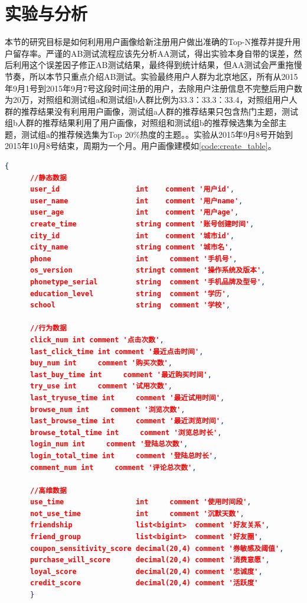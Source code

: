   \section{实验与分析}
  本节的研究目标是如何利用用户画像给新注册用户做出准确的Top-N推荐并提升用户留存率。严谨的AB测试流程应该先分析AA测试，得出实验本身自带的误差，然后利用这个误差因子修正AB测试结果，最终得到统计结果，但AA测试会严重拖慢节奏，所以本节只重点介绍AB测试。实验最终用户人群为北京地区，所有从2015年9月1号到2015年9月7号这段时间注册的用户，去除用户注册信息不完整后用户数为20万，对照组和测试组a和测试组b人群比例为33.3：33.3：33.4，对照组用户人群的推荐结果没有利用用户画像，测试组a人群的推荐结果只包含热门主题，测试组b人群的推荐结果利用了用户画像，对照组和测试组b的推荐候选集为全部主题，测试组a的推荐候选集为Top 20\%热度的主题。。实验从2015年9月8号开始到2015年10月8号结束，周期为一个月。用户画像建模如\autoref{code:create_table}。
    \begin{lstlisting}[language=json,firstnumber=1,label={code:create_table}]
      {
      //静态数据
      user_id                  int    comment '用户id',
      user_name                int    comment '用户name',
      user_age                 int    comment '用户age',
      create_time              string comment '账号创建时间',
      city_id                  int    comment '城市id',
      city_name                string comment '城市名',
      phone                    int     comment '手机号',
      os_version               stringt comment '操作系统及版本',
      phonetype_serial         string  comment '手机品牌及型号',
      education_level          string  comment '学历',
      school                   string  comment '学校',

      //行为数据
      click_num int comment '点击次数',
      last_click_time int comment '最近点击时间',
      buy_num int     comment '购买次数',
      last_buy_time int     comment '最近购买时间',
      try_use int     comment '试用次数',
      last_tryuse_time int     comment '最近试用时间',
      browse_num int     comment '浏览次数',
      last_browse_time int     comment '最近浏览时间',
      browse_total_time int     comment '浏览总时长',
      login_num int     comment '登陆总次数',
      login_total_time int     comment '登陆总时长',
      comment_num int     comment '评论总次数',

      //高维数据
      use_time                 int     comment '使用时间段',
      not_use_time             int     comment '沉默天数',
      friendship               list<bigint>  comment '好友关系',
      friend_group             list<bigint>  comment '好友圈',
      coupon_sensitivity_score decimal(20,4) comment '券敏感及阈值',
      purchase_will_score      decimal(20,4) comment '消费意愿',
      loyal_score              decimal(20,4) comment '忠诚度',
      credit_score             decimal(20,4) comment '活跃度'
      }
    \end{lstlisting}
